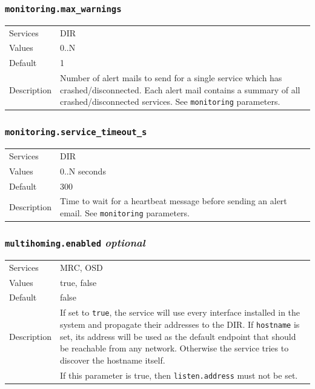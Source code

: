 \documentclass[a4paper,10pt]{book}
\begin{document}
\subsubsection{\texttt{monitoring.max\_warnings}}
\begin{tabular}{lp{10cm}}
 Services & DIR\\
 Values   & 0..N \\
 Default  & 1\\
 Description & Number of alert mails to send for a single service which has crashed/disconnected. Each alert mail contains a summary of all crashed/disconnected services. See \texttt{monitoring} parameters.
\end{tabular}

\subsubsection{\texttt{monitoring.service\_timeout\_s}}
\begin{tabular}{lp{10cm}}
 Services & DIR\\
 Values   & 0..N seconds \\
 Default  & 300 \\
 Description & Time to wait for a heartbeat message before sending an alert email. See \texttt{monitoring} parameters.
\end{tabular}

\subsubsection{\texttt{multihoming.enabled} \textit{optional}}
\label{option:multihoming.enabled}
\begin{tabular}{lp{10cm}}
 Services & MRC, OSD\\
 Values   & true, false\\
 Default  & false\\
 Description & If set to \texttt{true}, the service will use every interface installed in the system and propagate their addresses to the DIR. If \texttt{hostname} is set, its address will be used as the default endpoint that should be reachable from any network. Otherwise the service tries to discover the hostname itself.\\
 & If this parameter is true, then \texttt{listen.address} must not be set. 
\end{tabular}
\end{document}
